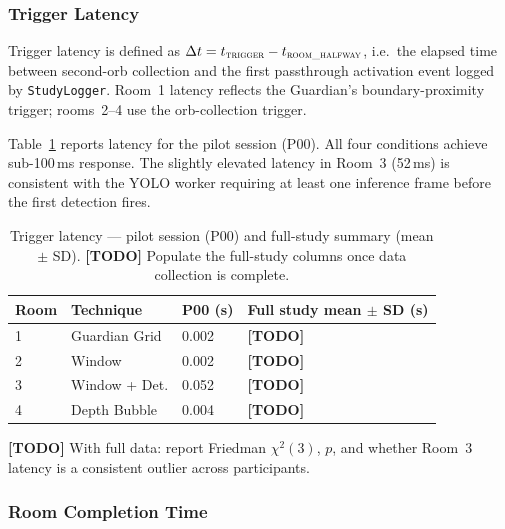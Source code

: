 \documentclass{styling/vgtc} %
\begin{document}
\subsubsection{Trigger Latency}

Trigger latency is defined as
$\Delta t = t_{\textsc{trigger}} - t_{\textsc{room\_halfway}}$,
i.e.\ the elapsed time between second-orb collection and the first
passthrough activation event logged by \texttt{StudyLogger}.
Room~1 latency reflects the Guardian's boundary-proximity trigger;
rooms~2--4 use the orb-collection trigger.

Table~\ref{tab:latency} reports latency for the pilot session (P00).
All four conditions achieve sub-100\,ms response. The slightly elevated
latency in Room~3 (52\,ms) is consistent with the YOLO worker requiring
at least one inference frame before the first detection fires.

\begin{table}[h]
\centering
\caption{Trigger latency — pilot session (P00) and full-study summary
  (mean $\pm$ SD). \textbf{[TODO]} Populate the full-study columns once
  data collection is complete.}
\label{tab:latency}
\begin{tabular}{@{}llll@{}}
\toprule
\textbf{Room} & \textbf{Technique} & \textbf{P00 (s)} & \textbf{Full study mean $\pm$ SD (s)} \\
\midrule
1 & Guardian Grid  & 0.002 & \textbf{[TODO]} \\
2 & Window         & 0.002 & \textbf{[TODO]} \\
3 & Window + Det.  & 0.052 & \textbf{[TODO]} \\
4 & Depth Bubble   & 0.004 & \textbf{[TODO]} \\
\bottomrule
\end{tabular}
\end{table}

\textbf{[TODO]} With full data: report Friedman $\chi^2(3)$, $p$, and
whether Room~3 latency is a consistent outlier across participants.

\subsubsection{Room Completion Time}
\end{document}
